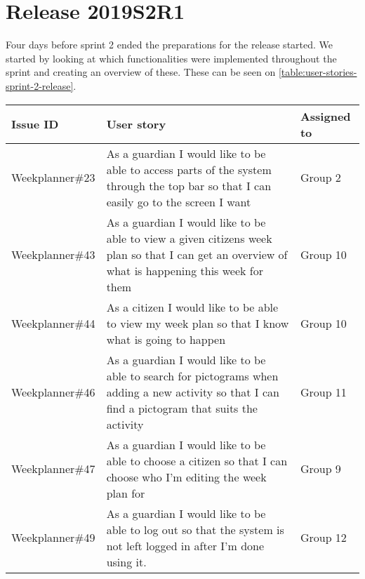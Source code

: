 \section{Release 2019S2R1}\label{sprint-2-release}
Four days before sprint 2 ended the preparations for the release started.
We started by looking at which functionalities were implemented throughout the sprint and creating an overview of these.
These can be seen on \autoref{table:user-stories-sprint-2-release}.

\begin{table}[H]
    \small
    \begin{tabular}{|p{2.8cm}|p{7cm}|p{2cm}|}
    \hline
    Issue ID        & User story                                                                                                                                                                               & Assigned to      \\ \hline
    Weekplanner\#23 & As a guardian I would like to be able to access parts of the system through the top bar so that I can easily go to the screen I want                                                     & Group 2             \\ \hline
    Weekplanner\#43 & As a guardian I would like to be able to view a given citizens week plan so that I can get an overview of what is happening this week for them                                           & Group 10            \\ \hline
    Weekplanner\#44 & As a citizen I would like to be able to view my week plan so that I know what is going to happen                                                                                         & Group 10            \\ \hline
    Weekplanner\#46 & As a guardian I would like to be able to search for pictograms when adding a new activity so that I can find a pictogram that suits the activity                                         & Group 11            \\ \hline
    Weekplanner\#47 & As a guardian I would like to be able to choose a citizen so that I can choose who I’m editing the week plan for                                                                         & Group 9             \\ \hline
    Weekplanner\#49 & As a guardian I would like to be able to log out so that the system is not left logged in after I’m done using it.                                                                       & Group 12            \\ \hline

\end{tabular}
\end{table}
